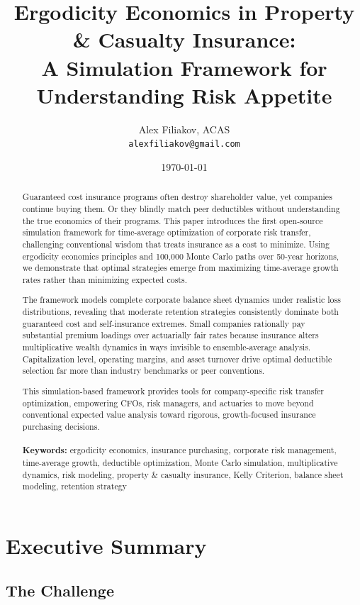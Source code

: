 \documentclass[11pt,letterpaper]{article}
\title{\Large \textbf{Ergodicity Economics in Property \& Casualty Insurance: \\
A Simulation Framework for Understanding Risk Appetite}}
\author{Alex Filiakov, ACAS\\
\texttt{alexfiliakov@gmail.com}}
\date{\today}
\begin{document}
\maketitle

\begin{abstract}
Guaranteed cost insurance programs often destroy shareholder value, yet companies continue buying them. Or they blindly match peer deductibles without understanding the true economics of their programs. This paper introduces the first open-source simulation framework for time-average optimization of corporate risk transfer, challenging conventional wisdom that treats insurance as a cost to minimize. Using ergodicity economics principles and 100,000 Monte Carlo paths over 50-year horizons, we demonstrate that optimal strategies emerge from maximizing time-average growth rates rather than minimizing expected costs.

The framework models complete corporate balance sheet dynamics under realistic loss distributions, revealing that moderate retention strategies consistently dominate both guaranteed cost and self-insurance extremes. Small companies rationally pay substantial premium loadings over actuarially fair rates because insurance alters multiplicative wealth dynamics in ways invisible to ensemble-average analysis. Capitalization level, operating margins, and asset turnover drive optimal deductible selection far more than industry benchmarks or peer conventions.

This simulation-based framework provides tools for company-specific risk transfer optimization, empowering CFOs, risk managers, and actuaries to move beyond conventional expected value analysis toward rigorous, growth-focused insurance purchasing decisions.
\\\\
\textbf{Keywords:} ergodicity economics, insurance purchasing, corporate risk management, time-average growth, deductible optimization, Monte Carlo simulation, multiplicative dynamics, risk modeling, property \& casualty insurance, Kelly Criterion, balance sheet modeling, retention strategy
\end{abstract}

\newpage
\tableofcontents
\newpage

\section{Executive Summary}

\subsection{The Challenge}
\end{document}
